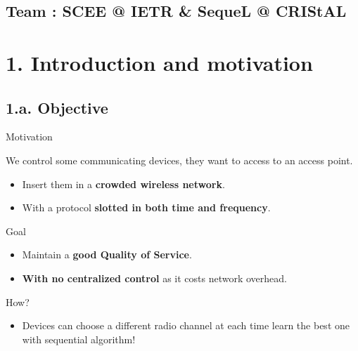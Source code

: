 \documentclass[12pt,english,ignorenonframetext,aspectratio=169,]{beamer}
\providecommand{\tightlist}{%
  \setlength{\itemsep}{0pt}\setlength{\parskip}{0pt}}
\begin{document}
\subsection*{\hfill{}Team {:} SCEE @ IETR \& SequeL @ CRIStAL\hfill{}}




\section{\hfill{}1. Introduction and motivation\hfill{}}

\subsection{\hfill{}1.a. Objective\hfill{}}

\begin{frame}{Motivation}

We control some communicating devices, they want to access to an access point.

\begin{itemize}
\tightlist
\item
  Insert them in a \textbf{crowded wireless network}.
\item
  With a protocol \textbf{slotted in both time and frequency}.
\end{itemize}

\begin{block}{Goal}

\begin{itemize}
\tightlist
\item
  Maintain a \textbf{good Quality of Service}.
\item
  \textbf{With no centralized control} as it costs network overhead.
\end{itemize}

\end{block}

\begin{block}{How?}

\begin{itemize}
\tightlist
\item
  Devices can choose a different radio channel at each time \hook learn
  the best one with sequential algorithm!
\end{itemize}

\end{block}

\end{frame}
\end{document}
